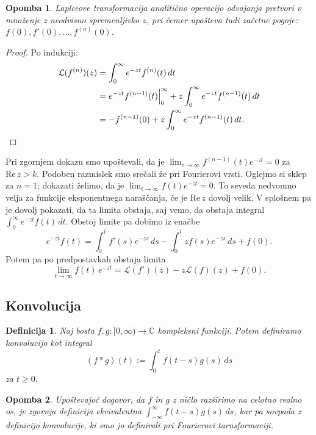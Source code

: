 \documentclass[10pt, a4paper]{article}
\newtheorem{defi}{Definicija}[section]
\newenvironment{noticeB}{%
  \tcolorbox[%
  notitle,
  empty,
  enhanced,  %
  breakable,
  coltext=black,
  colback=white, 
  fontupper=\rmfamily,
  parbox=false,
  noparskip,
  sharp corners,
  boxrule=-1pt,  %
  frame hidden,
  left=7pt,  %
  right=7pt,
  top=5pt,
  bottom=5pt,
  before skip=2.5ex plus 2pt,
  after skip=2.5ex plus 2pt,
  borderline west = {1.5pt}{-0.1pt}{blue!30!black}, %
  overlay unbroken and last={%
    \draw[color=black, line width=1.25pt]
    ($(frame.south west)+(1.pt, -0.1pt)$) -- ++(2em, 0);
  }
  ]}
{\endtcolorbox}
\newenvironment{definicija}{\begin{defi}\begin{noticeB}}{%
    \end{noticeB}\end{defi}}
\newtheorem*{opomba}{Opomba}
\newenvironment{noticeC}{%
  \tcolorbox[%
  notitle,
  empty,
  enhanced,  %
  breakable,
  coltext=black, 
  fontupper=\rmfamily,
  parbox=false,
  noparskip,
  sharp corners,
  boxrule=-1pt,  %
  frame hidden,
  left=7pt,  %
  right=7pt,
  top=5pt,
  bottom=5pt,
  before skip=2.5ex plus 2pt,
  after skip=2.5ex plus 2pt,
  overlay unbroken and last={%
  },
  ]}
{\endtcolorbox}
\newenvironment{dokaz}%
  {\begin{noticeC}\begin{proof}}%
  {\end{proof}\end{noticeC}}
\newcommand{\C}{\mathbb {C}}
\newcommand{\re}{\mathrm{Re}\,}
\begin{document}
\begin{opomba}
  Laplceove transformacija analitično operacijo odvajanja pretvori v množenje z 
  neodvisno spremenljivko $z$, pri čemer upošteva tudi začetne pogoje: $f(0), f'(0), \dots, f^{(n)} (0)$.
\end{opomba}
 
\begin{dokaz}
  Po indukciji:
  \begin{align*}
    \mathcal{L} (f^{(n)}) (z) &= \int_0 ^\infty e^{-zt} f^{(n)} (t)\, dt\\
    &=e^{-zt} f^{(n - 1)} (t) \Big|_0 ^\infty + z \int_0 ^\infty e^{-zt} f^{(n - 1)} (t)\, dt\\
    &= -f^{(n - 1)} (0) + z \int_0 ^\infty e^{-zt} f^{(n - 1)}(t)\, dt. \qedhere 
  \end{align*}
\end{dokaz}

Pri zgornjem dokazu smo upoštevali, da je $\lim_{z \to \infty} f^{(n - 1)} (t) e^{-zt} = 0$
za $\re z > k$. Podoben razmislek smo srečali že pri Fourierovi vrsti.
Oglejmo si sklep za $n = 1$; dokazati želimo, da je $\lim_{t \to \infty} f(t) e^{-zt} = 0$.
To seveda nedvomno velja za funkcije eksponentnega naraščanja, če je $\re z$ dovolj velik.
V splošnem pa je dovolj pokazati, da ta limita obstaja, saj vemo, da obstaja integral 
$\int_0 ^\infty e^{-zt} f(t)\, dt$. Obstoj limite pa dobimo iz enačbe 
$$e^{-zt} f(t) = \int_0 ^t f' (s) e^{-zs}\, ds - \int_0 ^t z f(s) e^{-zs}\, ds + f(0).$$
Potem pa po predpostavkah obstaja limita 
$$\lim_{t \to \infty} f(t)\, e^{-zt} = \mathcal{L} (f') (z) - z \mathcal{L} (f) (z) + f(0).$$

\subsection{Konvolucija}

\begin{definicija}
  Naj bosta $f, g: [0, \infty) \to \C$ kompleksni funkciji.
  Potem definiramo konvolucijo kot integral
  $$(f * g) (t) := \int_0 ^t f(t - s) g(s)\, ds$$
  za $t \geq 0$.
\end{definicija}

\begin{opomba}
  Upoštevajoč dogovor, da $f$ in $g$ z ničlo razširimo na celotno realno os,
  je zgornja definicija ekvivalentna $\int_{-\infty} ^\infty f(t - s) g(s)\, ds$,
  kar pa sovpada z definicijo konvolucije, ki smo jo definirali pri Fourierovi tarnsformaciji.
\end{opomba}
\end{document}

